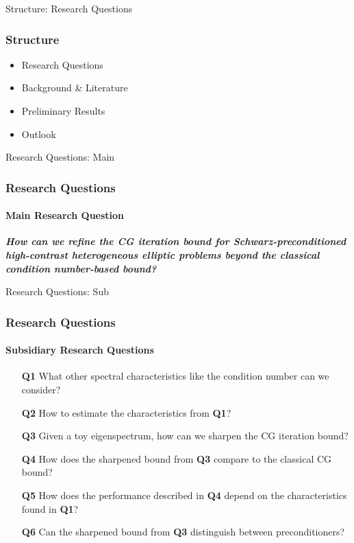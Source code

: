 \begin{frame}[label=questions]{Structure: Research Questions}
    \frametitle{Structure}
    \begin{itemize}
        \item {\color{tud grapefruit}Research Questions}
        \item Background \& Literature
        \item Preliminary Results
        \item Outlook
    \end{itemize}
\end{frame}

\begin{frame}[label=questions]{Research Questions: Main}
    \frametitle{Research Questions}
    \framesubtitle{Main Research Question}
    \vspace{0.2\pageheight}
    \begin{center}
    \textit{\textbf{How can we refine the CG iteration bound for Schwarz-preconditioned high-contrast heterogeneous elliptic problems beyond the classical condition number-based bound?}}
    \end{center}
\end{frame}

\begin{frame}[label=questions]{Research Questions: Sub}
    \frametitle{Research Questions}
    \framesubtitle{Subsidiary Research Questions}
    \setlength\itemindent{1in}
    \begin{itemize}
        \item[\textbf{Q1}] What other spectral characteristics like the condition number can we consider?
        \item[\textbf{Q2}] How to estimate the characteristics from \textbf{Q1}?
        \item[\textbf{Q3}] Given a toy eigenspectrum, how can we sharpen the CG iteration bound?
        \item[\textbf{Q4}] How does the sharpened bound from \textbf{Q3} compare to the classical CG bound?
        \item[\textbf{Q5}] How does the performance described in \textbf{Q4} depend on the characteristics found in \textbf{Q1}?
        \item[\textbf{Q6}] Can the sharpened bound from \textbf{Q3} distinguish between preconditioners? 
    \end{itemize}
\end{frame}